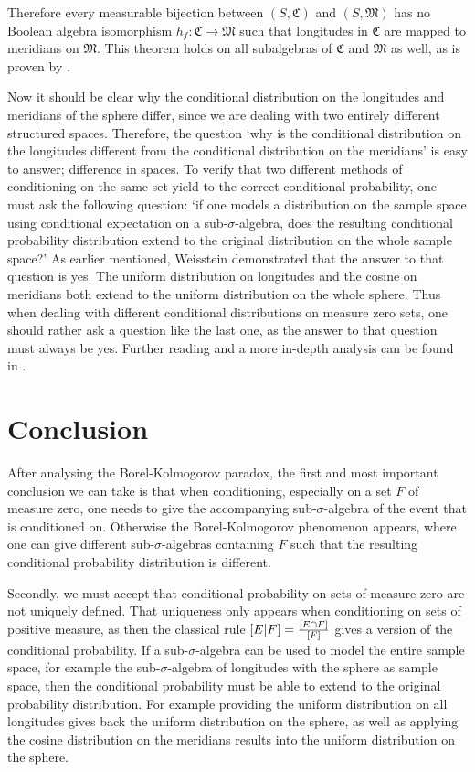 \documentclass[twoside,a4paper]{report}
\theoremstyle{plain}
\theoremstyle{definition}
\theoremstyle{remark}
\numberwithin{equation}{chapter}
\let\P\relax
\DeclareMathOperator{\P}{\mathbb{P}}
\DeclareMathOperator{\1}{\mathbbm{1}}
\begin{document}
Therefore every measurable bijection between $(S,\mathfrak{C})$ and $(S,\mathfrak{M})$ has no Boolean algebra isomorphism $h_f\colon\mathfrak{C}\to\mathfrak{M}$ such that longitudes in $\mathfrak{C}$ are mapped to meridians on $\mathfrak{M}$. This theorem holds on all subalgebras of $\mathfrak{C}$ and $\mathfrak{M}$ as well, as is proven by \cite{Gyenis17}.

Now it should be clear why the conditional distribution on the longitudes and meridians of the sphere differ, since we are dealing with two entirely different structured spaces. Therefore, the question `why is the conditional distribution on the longitudes different from the conditional distribution on the meridians' is easy to answer; difference in spaces. To verify that two different methods of conditioning on the same set yield to the correct conditional probability, one must ask the following question: `if one models a distribution on the sample space using conditional expectation on a sub-$\sigma$-algebra, does the resulting conditional probability distribution extend to the original distribution on the whole sample space?' As earlier mentioned, Weisstein \cite{Weisstein} demonstrated that the answer to that question is yes. The uniform distribution on longitudes and the cosine on meridians both extend to the uniform distribution on the whole sphere. Thus when dealing with different conditional distributions on measure zero sets, one should rather ask a question like the last one, as the answer to that question must always be yes. Further reading and a more in-depth analysis can be found in \cite{Gyenis17}.


\section{Conclusion}
After analysing the Borel-Kolmogorov paradox, the first and most important conclusion we can take is that when conditioning, especially on a set $F$ of measure zero, one needs to give the accompanying sub-$\sigma$-algebra of the event that is conditioned on. Otherwise the Borel-Kolmogorov phenomenon appears, where one can give different sub-$\sigma$-algebras containing $F$ such that the resulting conditional probability distribution is different.

Secondly, we must accept that conditional probability on sets of measure zero are not uniquely defined. That uniqueness only appears when conditioning on sets of positive measure, as then the classical rule $\P[E|F]=\frac{\P[E\cap F]}{\P[F]}$ gives a version of the conditional probability. If a sub-$\sigma$-algebra can be used to model the entire sample space, for example the sub-$\sigma$-algebra of longitudes with the sphere as sample space, then the conditional probability must be able to extend to the original probability distribution. For example providing the uniform distribution on all longitudes gives back the uniform distribution on the sphere, as well as applying the cosine distribution on the meridians results into the uniform distribution on the sphere.
\end{document}
